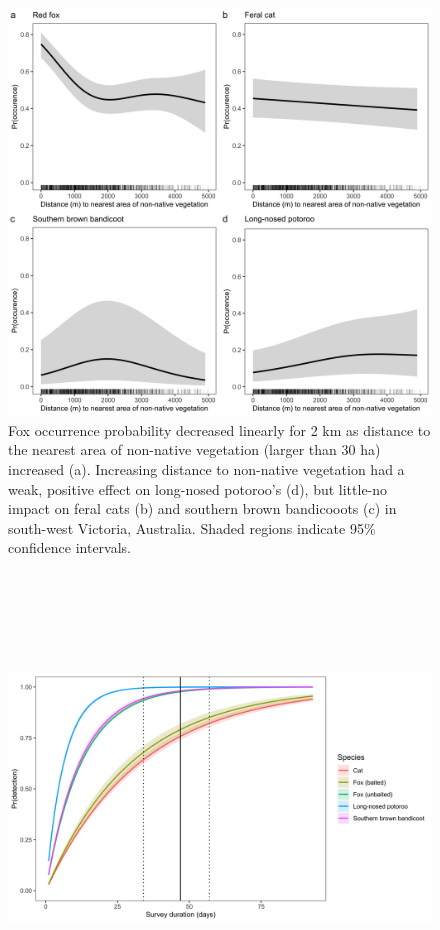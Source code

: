\documentclass[11pt,a4paper,titlepage,twoside,openright]{style/unimelbthesis}
\begin{document}
\begin{mainmatter}
\begin{figure}
{\centering \includegraphics[width=1\linewidth]{figure/dist_edge} 

}

\caption{Fox occurrence probability decreased linearly for 2 km as distance to the nearest area of non-native vegetation (larger than 30 ha) increased (a). Increasing distance to non-native vegetation had a weak, positive effect on long-nosed potoroo's (d), but little-no impact on feral cats (b) and southern brown bandicooots (c) in south-west Victoria, Australia. Shaded regions indicate 95\% confidence intervals.}\label{fig:occ-dist}
\end{figure}
\newpage

\(~\)

\(~\)

\(~\)
\begin{figure}

{\centering \includegraphics[width=1\linewidth]{figure/detectability} 

}
\end{figure}
\end{mainmatter}
\end{document}
